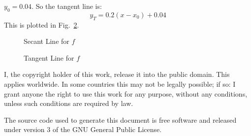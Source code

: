 \documentclass{article}
\theoremstyle{normal}
\begin{document}
    $y_{0}=0.04$. So the tangent line is:
    \begin{equation}
        y_{T}=0.2(x-x_{0})+0.04
    \end{equation}
    This is plotted in Fig.~\ref{fig:tan_line}.
    \begin{figure}
        \centering
        \caption{Secant Line for $f$}
        \label{fig:sec_line}
    \end{figure}
    \begin{figure}
        \centering
        \caption{Tangent Line for $f$}
        \label{fig:tan_line}
    \end{figure}
    \newpage
    I, the copyright holder of this work, release it into the public domain.
    This applies worldwide. In some countries this may not be legally possible;
    if so: I grant anyone the right to use this work for any purpose, without
    any conditions, unless such conditions are required by law.
    \par\hfill\par
    The source code used to generate this document is free software and released
    under version 3 of the GNU General Public License.
\end{document}
